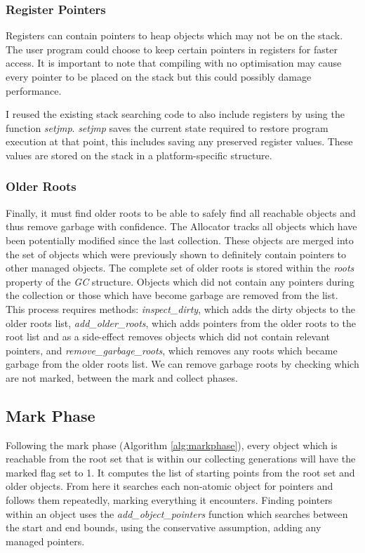 \documentclass[../diss.tex]{subfiles}
\begin{document}
\subsubsection{Register Pointers}
Registers can contain pointers to heap objects which may not be on the stack. The user program could choose to keep certain pointers in registers for faster access. It is important to note that compiling with no optimisation may cause every pointer to be placed on the stack but this could possibly damage performance. 

I reused the existing stack searching code to also include registers by using the function \emph{setjmp}. \emph{setjmp} saves the current state required to restore program execution at that point, this includes saving any preserved register values. These values are stored on the stack in a platform-specific structure.

\subsubsection{Older Roots}

Finally, it must find older roots to be able to safely find all reachable objects and thus remove garbage with confidence. The Allocator tracks all objects which have been potentially modified since the last collection. These objects are merged into the set of objects which were previously shown to definitely contain pointers to other managed objects. The complete set of older roots is stored within the \emph{roots} property of the \emph{GC} structure. Objects which did not contain any pointers during the collection or those which have become garbage are removed from the list. This process requires methods: \emph{inspect\_dirty}, which adds the dirty objects to the older roots list, \emph{add\_older\_roots}, which adds pointers from the older roots to the root list and as a side-effect removes objects which did not contain relevant pointers, and \emph{remove\_garbage\_roots}, which removes any roots which became garbage from the older roots list. We can remove garbage roots by checking which are not marked, between the mark and collect phases.

\subsection{Mark Phase}
\label{sec:markphase}

Following the mark phase (Algorithm \ref{alg:markphase}), every object which is reachable from the root set that is within our collecting generations will have the marked flag set to 1. It computes the list of starting points from the root set and older objects. From here it searches each non-atomic object for pointers and follows them repeatedly, marking everything it encounters. Finding pointers within an object uses the \emph{add\_object\_pointers} function which searches between the start and end bounds, using the conservative assumption, adding any managed pointers.
\end{document}
